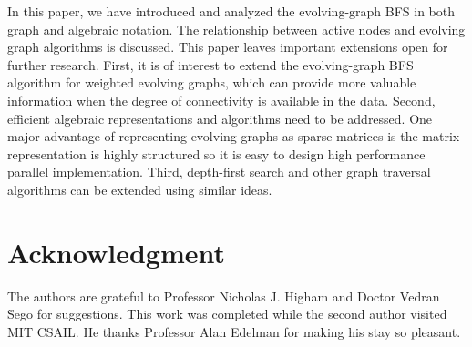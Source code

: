 \documentclass[11pt,conference,compsocconf]{IEEEtran}
\theoremstyle{definition}
\begin{document}
In this paper, we have introduced and analyzed the evolving-graph BFS in both
graph and algebraic notation. The relationship between active nodes and
evolving graph algorithms is discussed.
This paper leaves important extensions open for further research. First, it is
of interest to extend the evolving-graph BFS algorithm for weighted evolving graphs, which can provide more valuable information when the degree of connectivity is available in the data.
Second, efficient algebraic representations and algorithms need to be addressed.
One major advantage of representing evolving graphs as sparse matrices
is the matrix representation is highly structured so it is easy to design
high performance parallel implementation.
Third, depth-first search and other graph traversal algorithms can be
extended using similar ideas.


\section*{Acknowledgment}


The authors are grateful to Professor Nicholas J. Higham and Doctor Vedran \u Sego for suggestions.
This work was completed while the second author visited MIT CSAIL. He thanks
Professor Alan Edelman for making his stay so pleasant.



%
%
%





\end{document}
